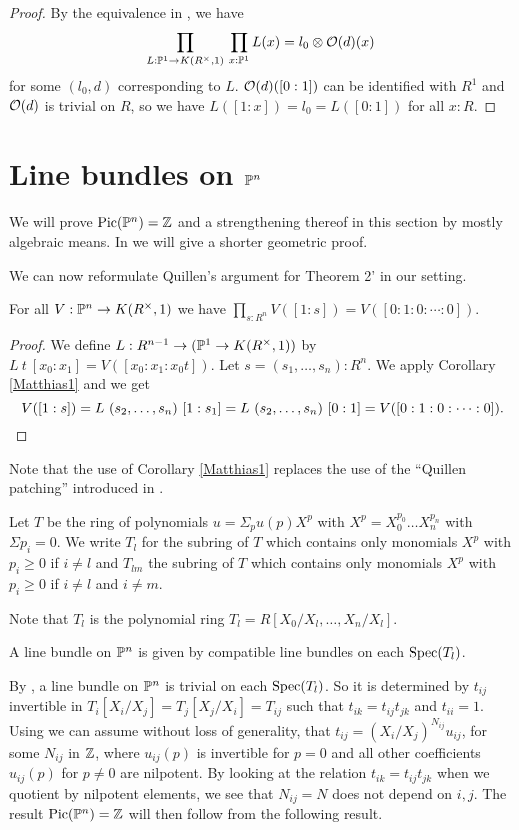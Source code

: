 \begin{proof}
  By the equivalence in , we have
  \[ \prod_{L:\mathbb{P}^1\to K(R^{\times},1)} \,\prod_{x : \mathbb{P}^1}  L(x)=l_0\otimes \mathcal{O}(d)(x) \]
  for some $(l_0,d)$ corresponding to $L$.
  $\mathcal{O}(d)([0:1])$ can be identified with $R^1$ and $\mathcal{O}(d)$ is trivial on $R$,
  so we have $L([1:x])=l_0=L([0:1])$ for all $x:R$.
\end{proof}

\section{Line bundles on $\mathbb{P}^n$}
We will prove $\mathrm{Pic}(\mathbb{P}^n)=\mathbb{Z}$ and a strengthening thereof in this section by mostly algebraic means.
In  we will give a shorter geometric proof.

We can now reformulate Quillen's argument for Theorem 2' \cite{Quillen} in our setting.

\begin{proposition}\label{trivial}
  For all $V:\mathbb{P}^n\rightarrow K(R^{\times},1)$ we have ${\prod_{s:R^n}V([1:s]) = V([0:1:0:\cdots :0])}$.
\end{proposition}

\begin{proof}
  We define $L:R^{n-1}\rightarrow (\mathbb{P}^1 \to K(R^{\times},1))$ by $L~t~[x_0:x_1] = V([x_0:x_1:x_0t])$.
  Let $s=(s_1,\dots,s_{n}):R^{n}$. We apply Corollary \ref{Matthias1} and we get
  \[
   V([1:s]) = L~(s_2,\dots,s_n)~[1:s_1] = L~(s_2,\dots,s_n)~[0:1] = V([0:1:0:\cdots :0])
   \rlap{.}
  \]
\end{proof}

 Note that the use of Corollary \ref{Matthias1} replaces the use of the ``Quillen patching''
 \cite{lombardi-quitte} introduced in \cite{Quillen}.

\medskip

Let $T$ be the ring of polynomials $u = \Sigma_p u(p)X^p$ with
$X^p = X_0^{p_0}\dots X_n^{p_n}$ with $\Sigma p_i = 0$. We write $T_l$ for the subring
of $T$ which contains only monomials $X^p$ with $p_i\geqslant 0$ if $i\neq l$
and $T_{lm}$ the subring of $T$ 
which contains only monomials $X^p$ with $p_i\geqslant 0$ if $i\neq l$ and $i\neq m$.

Note that $T_l$ is the polynomial ring $T_l = R[X_0/X_l,\dots,X_n/X_l]$.

A line bundle on $\mathbb{P}^n$ is given by compatible line bundles on each $\operatorname{Spec}(T_l)$.

By , a line bundle on $\mathbb{P}^n$ is trivial on each $\operatorname{Spec}(T_l)$.
So it is determined by $t_{ij}$ invertible in $T_i[X_i/X_j] = T_j[X_j/X_i] = T_{ij}$
such that $t_{ik} = t_{ij}t_{jk}$ and $t_{ii} = 1$. 
Using  we can assume without loss of generality, that
$t_{ij} = (X_i/X_j)^{N_{ij}} u_{ij}$, for some $N_{ij}$ in $\mathbb{Z}$, where $u_{ij}(p)$ is invertible for $p = 0$
and all other coefficients $u_{ij}(p)$ for $p\neq 0$
are nilpotent. By looking at the relation  $t_{ik} = t_{ij}t_{jk}$ when we quotient by nilpotent elements, we see that
$N_{ij} = N$ does not depend on $i,j$.
The result $\mathrm{Pic}(\mathbb{P}^n) = \mathbb{Z}$ will then follow from the following result.


